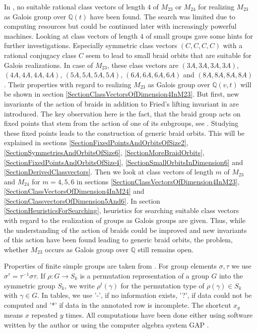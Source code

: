 \documentclass[12pt,a4paper]{article}
\numberwithin{equation}{section}
\numberwithin{table}{section}
\begin{document}
\noindent
In \cite{RefHae1991}, no suitable rational class vectors of length $4$ of $M_{23}$ or $M_{24}$
for realizing $M_{23}$ as Galois group over $\mathbb{Q}(t)$ have been found. The search was limited due
to computing resources but could be continued later with increasingly powerful machines.
Looking at class vectors of length $4$ of small groups gave some hints for further investigations.
Especially symmetric class vectors $(C,C,C,C)$ with a rational conjugacy class $C$ seem to lead to small
braid orbits that are suitable for Galois realizations.
In case of $M_{23}$, these class vectors are $(3A,3A,3A,3A)$, $(4A,4A,4A,4A)$, $(5A,5A,5A,5A)$, $(6A,6A,6A,6A)$
and $(8A,8A,8A,8A)$. Their properties with regard to realizing $M_{23}$ as Galois group over $\mathbb{Q}(v,t)$
will be shown in section \ref{SectionClassVectorsOfDimension4InM23}.
But first, new invariants of the action of braids in addition to Fried's lifting invariant
in \cite{RefFri2010} are introduced. The key observation here is the fact, that the braid group acts on
fixed points that stem from the action of one of its subgroups, see \cite[p. 4]{RefHae1991}.
Studying these fixed points leads to the construction of generic braid orbits.
This will be explained in sections \ref{SectionFixedPointsAndOrbitsOfSize2}, \ref{SectionSymmetriesAndOrbitsOfSize6},
\ref{SectionMoreBraidOrbits}, \ref{SectionFixedPointsAndOrbitsOfSize4}, \ref{SectionSmallOrbitsInDimension6} and
\ref{SectionDerivedClassvectors}.
Then we look at class vectors of length $m$ of $M_{23}$ and $M_{24}$ for $m=4,5,6$ in 
sections \ref{SectionClassVectorsOfDimension4InM23}, \ref{SectionClassVectorsOfDimension4InM24} and
\ref{SectionClassvectorsOfDimension5And6}.
In section \ref{SectionHeuristicsForSearching}, heuristics for searching suitable class vectors with regard
to the realization of groups as Galois groups are given.
Thus, while the understanding of the action of braids could be improved and new invariants of this action
have been found leading to generic braid orbits, the problem, whether $M_{23}$ occurs as Galois group
over $\mathbb{Q}$ still remains open.
\par
\noindent
Properties of finite simple groups are taken from \cite{RefAtlas1985}.
For group elements $\sigma, \tau$ we use $\sigma^{\tau} = \tau^{-1} \sigma \tau$.
If $\rho : G \rightarrow S_k$ is a permutation representation of a group $G$ into
the symmetric group $S_k$, we write $\rho^t(\gamma)$ for the permutation type of 
$\rho(\gamma) \in S_k$ with $\gamma \in G$.
In tables, we use '-', if no information exists, '?', if data could not be computed and '*' if data in
the annotated row is incomplete. The shortcut $x_y$ means $x$ repeated $y$ times.
All computations have been done either using software written by the author
or using the computer algebra system GAP \cite{RefGAP}.
\end{document}
